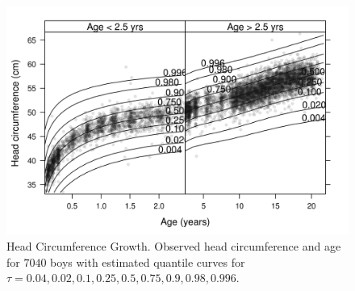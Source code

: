 



\begin{figure}[t]
\includegraphics{figures/fig-heads-plot}
\caption{Head Circumference Growth. Observed head circumference and age for 
         $7040$ boys with estimated quantile curves for 
         $\tau = 0.04, 0.02, 0.1, 0.25, 0.5, 0.75, 0.9, 0.98, 0.996$.
         \label{heads-plot}}
\end{figure}
